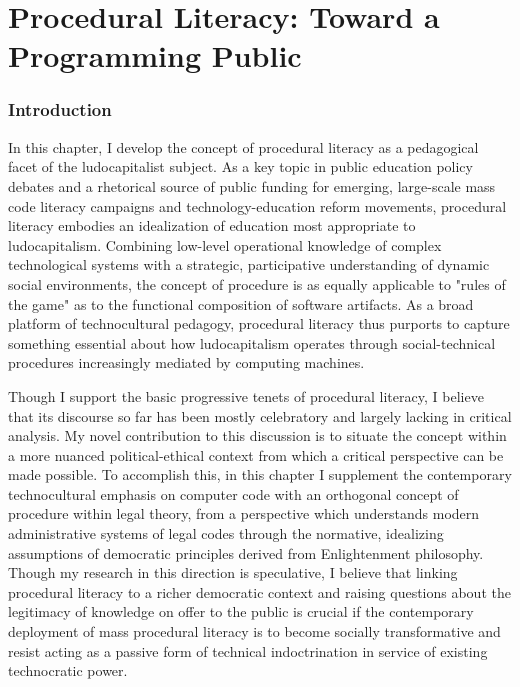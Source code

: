 \chapter{Procedural Literacy: Toward a Programming Public}
\label{literacy}

\subsection*{Introduction}
In this chapter, I develop the concept of procedural literacy as a pedagogical facet of the ludocapitalist subject. As a key topic in public education policy debates and a rhetorical source of public funding for emerging, large-scale mass code literacy campaigns and technology-education reform movements, procedural literacy embodies an idealization of education most appropriate to ludocapitalism. Combining low-level operational knowledge of complex technological systems with a strategic, participative understanding of dynamic social environments, the concept of procedure is as equally applicable to "rules of the game" as to the functional composition of software artifacts. As a broad platform of technocultural pedagogy, procedural literacy thus purports to capture something essential about how ludocapitalism operates through social-technical procedures increasingly mediated by computing machines.

Though I support the basic progressive tenets of procedural literacy, I believe that its discourse so far has been mostly celebratory and largely lacking in critical analysis. My novel contribution to this discussion is to situate the concept within a more nuanced political-ethical context from which a critical perspective can be made possible. To accomplish this, in this chapter I supplement the contemporary technocultural emphasis on computer code with an orthogonal concept of procedure within legal theory, from a perspective which understands modern administrative systems of legal codes through the normative, idealizing assumptions of democratic principles derived from Enlightenment philosophy. Though my research in this direction is speculative, I believe that linking procedural literacy to a richer democratic context and raising questions about the legitimacy of knowledge on offer to the public is crucial if the contemporary deployment of mass procedural literacy is to become socially transformative and resist acting as a passive form of technical indoctrination in service of existing technocratic power.

